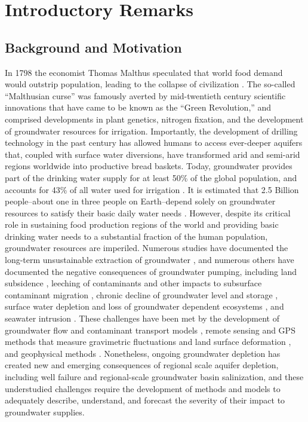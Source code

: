 \chapter[Introductory Remarks.]{Introductory Remarks}

\section{Background and Motivation}

In 1798 the economist Thomas Malthus speculated that world food demand would outstrip population, leading to the collapse of civilization \citep{malthus1992malthus}. The so-called ``Malthusian curse'' was famously averted by mid-twentieth century scientific innovations that have came to be known as the ``Green Revolution,'' and comprised developments in plant genetics, nitrogen fixation, and the development of groundwater resources for irrigation. Importantly, the development of drilling technology in the past century has allowed humans to access ever-deeper aquifers that, coupled with surface water diversions, have transformed arid and semi-arid regions worldwide into productive bread baskets. Today, groundwater provides part of the drinking water supply for at least 50\% of the global population, and accounts for 43\% of all water used for irrigation \citep{siebert2010groundwater}. It is estimated that 2.5 Billion people--about one in three people on Earth--depend solely on groundwater resources to satisfy their basic daily water needs \citep{unesco2015}. However, despite its critical role in sustaining food production regions of the world and providing basic drinking water needs to a substantial fraction of the human population, groundwater resources are imperiled. Numerous studies have documented the long-term unsustainable extraction of groundwater \citep{Famiglietti2014, wada2010global, Doll2012, Gleeson2012, de2019environmental}, and numerous others have documented the negative consequences of groundwater pumping, including land subsidence \citep{Brush2013}, leeching of contaminants and other impacts to subsurface contaminant migration \citep{smith2018overpumping}, chronic decline of groundwater level and storage \citep{Scanlon2012}, surface water depletion and loss of groundwater dependent ecosystems \citep{TNC2014}, and seawater intrusion \citep{bear1999seawater}. These challenges have been met by the development of groundwater flow and contaminant transport models \citep{domenico1998physical, Fetter2001}, remote sensing and GPS methods that measure gravimetric fluctuations \citep{ramillien2008detection} and land surface deformation \citep{galloway1998detection}, and geophysical methods \citep{goebel2019mapping}. Nonetheless, ongoing groundwater depletion has created new and emerging consequences of regional scale aquifer depletion, including well failure and regional-scale groundwater basin salinization, and these understudied challenges require the development of methods and models to adequately describe, understand, and forecast the severity of their impact to groundwater supplies.  

